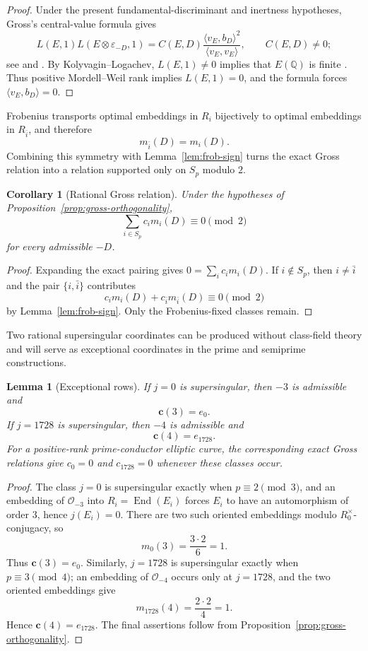 \documentclass[11pt]{amsart}
\newtheorem{lemma}[theorem]{Lemma}
\newtheorem{corollary}[theorem]{Corollary}
\theoremstyle{definition}
\theoremstyle{remark}
\newcommand{\Q}{\mathbb{Q}}
\newcommand{\OO}{\mathcal{O}}
\newcommand{\End}{\operatorname{End}}
\newcommand{\crow}{\mathbf{c}}
\begin{document}
\begin{proof}
Under the present fundamental-discriminant and inertness hypotheses, Gross's central-value formula gives
\[
  L(E,1)L(E\otimes\varepsilon_{-D},1)
  =C(E,D)\frac{\langle v_E,b_D\rangle^2}{\langle v_E,v_E\rangle},
  \qquad C(E,D)\ne0;
\]
see \cite[Proposition~13.5]{Gross1987} and \cite[Proposition~24]{KazalickiKohen2017}.  By Kolyvagin--Logachev, $L(E,1)\ne0$ implies that $E(\Q)$ is finite \cite[Theorem~0.3]{KolyvaginLogachev1990}.  Thus positive Mordell--Weil rank implies $L(E,1)=0$, and the formula forces $\langle v_E,b_D\rangle=0$.
\end{proof}

Frobenius transports optimal embeddings in $R_i$ bijectively to optimal embeddings in $R_{\bar i}$, and therefore
\[
  m_{\bar i}(D)=m_i(D).
\]
Combining this symmetry with Lemma~\ref{lem:frob-sign} turns the exact Gross relation into a relation supported only on $S_p$ modulo $2$.

\begin{corollary}[Rational Gross relation]\label{cor:rational-relation}
Under the hypotheses of Proposition~\ref{prop:gross-orthogonality},
\[
  \sum_{i\in S_p}c_i m_i(D)\equiv0\pmod2
\]
for every admissible $-D$.
\end{corollary}

\begin{proof}
Expanding the exact pairing gives $0=\sum_i c_i m_i(D)$.  If $i\notin S_p$, then $i\ne\bar i$ and the pair $\{i,\bar i\}$ contributes
\[
  c_i m_i(D)+c_{\bar i}m_{\bar i}(D)\equiv0\pmod2
\]
by Lemma~\ref{lem:frob-sign}.  Only the Frobenius-fixed classes remain.
\end{proof}

Two rational supersingular coordinates can be produced without class-field theory and will serve as exceptional coordinates in the prime and semiprime constructions.

\begin{lemma}[Exceptional rows]\label{lem:exceptional-rows}
If $j=0$ is supersingular, then $-3$ is admissible and
\[
  \crow(3)=e_0.
\]
If $j=1728$ is supersingular, then $-4$ is admissible and
\[
  \crow(4)=e_{1728}.
\]
For a positive-rank prime-conductor elliptic curve, the corresponding exact Gross relations give $c_0=0$ and $c_{1728}=0$ whenever these classes occur.
\end{lemma}

\begin{proof}
The class $j=0$ is supersingular exactly when $p\equiv2\pmod3$, and an
embedding of $\OO_{-3}$ into $R_i=\End(E_i)$ forces $E_i$ to have an
automorphism of order $3$, hence $j(E_i)=0$.  There are two such oriented
embeddings modulo $R_0^\times$-conjugacy, so
\[
  m_0(3)=\frac{3\cdot2}{6}=1.
\]
Thus $\crow(3)=e_0$.  Similarly, $j=1728$ is supersingular exactly when
$p\equiv3\pmod4$; an embedding of $\OO_{-4}$ occurs only at $j=1728$, and
the two oriented embeddings give
\[
  m_{1728}(4)=\frac{2\cdot2}{4}=1.
\]
Hence $\crow(4)=e_{1728}$.  The final assertions follow from
Proposition~\ref{prop:gross-orthogonality}.
\end{proof}
\end{document}

